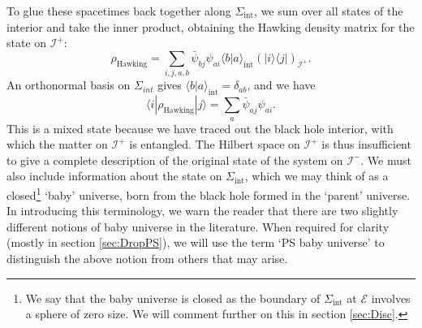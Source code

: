 \documentclass[letterpaper,12pt]{article}
\newcommand*{\scri}{\mathscr{I}} %
\newcommand*{\evap}{\mathscr{E}} %
\begin{document}
To glue these spacetimes back together along $\Sigma_\mathrm{int}$, we sum over all states of the interior and take the inner product, obtaining the Hawking density matrix for the state on $\scri^+$:
\begin{equation}
	\rho_\text{Hawking} = \sum_{i,j,a,b} \bar{\psi}_{b j}\psi_{a i} \langle b|a \rangle_{\mathrm{int}} \left(|i\rangle\langle j |\right)_{\scri^+}.
\end{equation}
An orthonormal basis on $\Sigma_{int}$ gives $\langle b|a \rangle_{\mathrm{int}}=\delta_{ab}$, and we have
\begin{equation}
	\langle i|\rho_\text{Hawking}|j\rangle = \sum_{a} \bar{\psi}_{a j}\psi_{a i}.
\end{equation}
This is a mixed state because we have traced out the black hole interior, with which the matter on $\scri^+$ is entangled. The Hilbert space on $\scri^+$ is thus insufficient to give a complete description of the original state of the system on $\scri^-$. We must also include information about the state on $\Sigma_\mathrm{int}$, which we may think of as a closed\footnote{We say that the baby universe is closed as the boundary of $\Sigma_\mathrm{int}$ at $\evap$ involves a sphere of zero size. We will comment further on this in section \ref{sec:Disc}. }
 `baby' universe, born from the black hole formed in the `parent' universe.  In introducing this terminology, we warn the reader that there are two slightly different notions of baby universe in the literature.   When required for clarity (mostly in section \ref{sec:DropPS}), we will use the term `PS baby universe' to distinguish the above notion from others that may arise.
\end{document}
